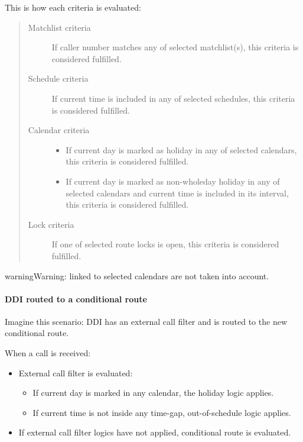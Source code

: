 \documentclass[letterpaper,10pt,english]{sphinxmanual}
\begin{document}
This is how each criteria is evaluated:
\begin{quote}
\begin{description}
\item[{Matchlist criteria}] \leavevmode
If caller number matches any of selected matchlist(s), this criteria is considered fulfilled.

\item[{Schedule criteria}] \leavevmode
If current time is included in any of selected schedules, this criteria is considered fulfilled.

\item[{Calendar criteria}] \leavevmode\begin{itemize}
\item {} 
If current day is marked as holiday in any of selected calendars, this criteria is considered fulfilled.

\item {} 
If current day is marked as non-wholeday holiday in any of selected calendars and current time is included
in its interval, this criteria is considered fulfilled.

\end{itemize}

\item[{Lock criteria}] \leavevmode
If one of selected route locks is open, this criteria is considered fulfilled.

\end{description}
\end{quote}

\begin{notice}{warning}{Warning:}
{\hyperref[administration_portal/client/vpbx/routing_tools/calendars:calendar\string-periods]{}} linked to selected calendars are not taken into account.
\end{notice}


\paragraph{DDI routed to a conditional route}
\label{administration_portal/client/vpbx/routing_endpoints/conditional_routes:ddi-routed-to-a-conditional-route}
Imagine this scenario: DDI has an external call filter and is routed to the new conditional route.

When a call is received:
\begin{itemize}
\item {} 
External call filter is evaluated:
\begin{itemize}
\item {} 
If current day is marked in any calendar, the holiday logic applies.

\item {} 
If current time is not inside any time-gap, out-of-schedule logic applies.

\end{itemize}

\item {} 
If external call filter logics have not applied, conditional route is evaluated.

\end{itemize}
\end{document}
